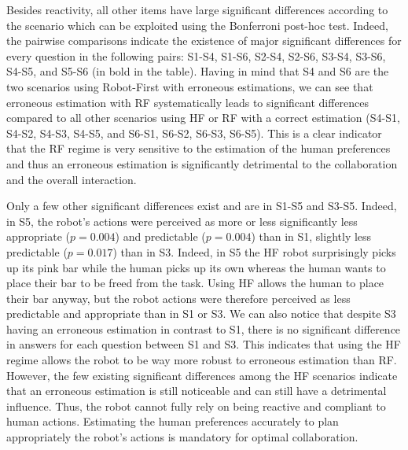 Besides reactivity, all other items have large significant differences according to the scenario which can be exploited using the Bonferroni post-hoc test. 
Indeed, the pairwise comparisons indicate the existence of major significant differences for every question in the following pairs: S1-S4, S1-S6, S2-S4, S2-S6, S3-S4, S3-S6, S4-S5, and S5-S6 (in bold in the table). Having in mind that S4 and S6 are the two scenarios using Robot-First with erroneous estimations, we can see that erroneous estimation with RF systematically leads to significant differences compared to all other scenarios using HF or RF with a correct estimation (S4-S1, S4-S2, S4-S3, S4-S5, and S6-S1, S6-S2, S6-S3, S6-S5). This is a clear indicator that the RF regime is very sensitive to the estimation of the human preferences and thus an erroneous estimation is significantly detrimental to the collaboration and the overall interaction. 

Only a few other significant differences exist and are in S1-S5 and S3-S5. Indeed, in S5, the robot's actions were perceived as more or less significantly less appropriate ($p=0.004$) and predictable ($p=0.004$) than in S1, slightly less predictable ($p=0.017$) than in S3. Indeed, in S5 the HF robot surprisingly picks up its pink bar while the human picks up its own whereas the human wants to place their bar to be freed from the task. Using HF allows the human to place their bar anyway, but the robot actions were therefore perceived as less predictable and appropriate than in S1 or S3. 
We can also notice that despite S3 having an erroneous estimation in contrast to S1, there is no significant difference in answers for each question between S1 and S3. 
This indicates that using the HF regime allows the robot to be way more robust to erroneous estimation than RF. However, the few existing significant differences among the HF scenarios indicate that an erroneous estimation is still noticeable and can still have a detrimental influence. Thus, the robot cannot fully rely on being reactive and compliant to human actions. Estimating the human preferences accurately to plan appropriately the robot's actions is mandatory for optimal collaboration.

